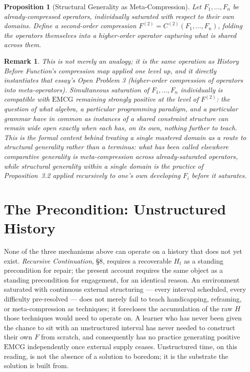\documentclass[11pt]{article}
\newtheorem{proposition}[definition]{Proposition}
\newtheorem*{remark}{Remark}
\begin{document}
\begin{proposition}[Structural Generality as Meta-Compression]
Let $F_1,\dots,F_n$ be already-compressed operators, individually saturated with respect to their own domains. Define a second-order compression $F^{(2)} = C^{(2)}(F_1,\dots,F_n)$, folding the operators themselves into a higher-order operator capturing what is shared across them.
\end{proposition}

\begin{remark}
This is not merely an analogy; it is the same operation as \emph{History Before Function}'s compression map applied one level up, and it directly instantiates that essay's Open Problem 3 (higher-order compression of operators into meta-operators). Simultaneous saturation of $F_1,\dots,F_n$ individually is compatible with $\mathrm{EMCG}$ remaining strongly positive at the level of $F^{(2)}$: the question of what algebra, a particular programming paradigm, and a particular grammar have in common as instances of a shared constraint structure can remain wide open exactly when each has, on its own, nothing further to teach. This is the formal content behind treating a single mastered domain as a route to structural generality rather than a terminus: what has been called elsewhere \emph{comparative generality} is meta-compression across already-saturated operators, while \emph{structural generality} within a single domain is the practice of Proposition~3.2 applied recursively to one's own developing $F_i$ before it saturates.
\end{remark}

\section{The Precondition: Unstructured History}

None of the three mechanisms above can operate on a history that does not yet exist. \emph{Recursive Continuation}, \S 8, requires a recoverable $H_t$ as a standing precondition for repair; the present account requires the same object as a standing precondition for engagement, for an identical reason. An environment saturated with continuous external structuring — every interval scheduled, every difficulty pre-resolved — does not merely fail to teach handicapping, reframing, or meta-compression as techniques; it forecloses the accumulation of the raw $H$ those techniques would need to operate on. A learner who has never been given the chance to sit with an unstructured interval has never needed to construct their own $F$ from scratch, and consequently has no practice generating positive $\mathrm{EMCG}$ independently once external supply ceases. Unstructured time, on this reading, is not the absence of a solution to boredom; it is the substrate the solution is built from.
\end{document}

